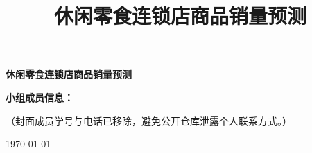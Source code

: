 \documentclass[UTF8,a4paper,12pt,fontset=windows]{ctexart}
\title{\bfseries 休闲零食连锁店商品销量预测}
\author{}
\date{}
\begin{document}
\begin{titlepage}
\centering
\vspace*{2.5cm}
{\bfseries 休闲零食连锁店商品销量预测\par}
\vspace{2.2cm}
\begin{flushleft}
\textbf{小组成员信息：}
\vspace{0.5cm}
{\large （封面成员学号与电话已移除，避免公开仓库泄露个人联系方式。）\par}
\end{flushleft}
\vfill
{\large \today\par}
\end{titlepage}


\clearpage















\end{document}
